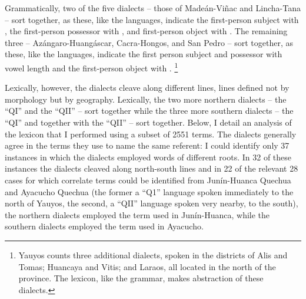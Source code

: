 Grammatically, two of the five dialects -- those of Made\'an-Vi\~nac and Lincha-Tana -- sort together, as these, like the \QII{} languages, indicate the first-person subject with , the first-person possessor with , and first-person object with . The remaining three -- Az\'angaro-Huang\'ascar, Cacra-Hongos, and San Pedro -- sort together, as these, like the \QI{} languages, indicate the first person subject and possessor with vowel length and the first-person object with .%
\footnote{Yauyos counts three additional dialects, spoken in the districts of Alis and Tomas; Huancaya and Vitis; and Laraos, all located in the north of the province. The lexicon, like the grammar, makes abstraction of these dialects.}

Lexically, however, the dialects cleave along different lines, lines defined not by morphology but by geography. Lexically, the two more northern dialects -- the ``QI'' \CH{} and the ``QII'' \LT{} -- sort together while the three more southern dialects -- the ``QI'' \AH{} and \SP{} together with the ``QII'' \MV{} -- sort together. Below, I detail an analysis of the lexicon that I performed using a subset of 2551 terms. The dialects generally agree in the terms they use to name the same referent: I could identify only 37 instances in which the dialects employed words of different roots. In 32 of these instances the dialects cleaved along north-south lines and in 22 of the relevant 28 cases for which correlate terms could be identified from Jun\'in-Huanca Quechua and Ayacucho Quechua (the former a ``Q1'' language spoken immediately to the north of Yauyos, the second, a ``QII'' language spoken very nearby, to the south), the northern dialects employed the term used in Jun\'in-Huanca, while the southern dialects employed the term used in Ayacucho.%

